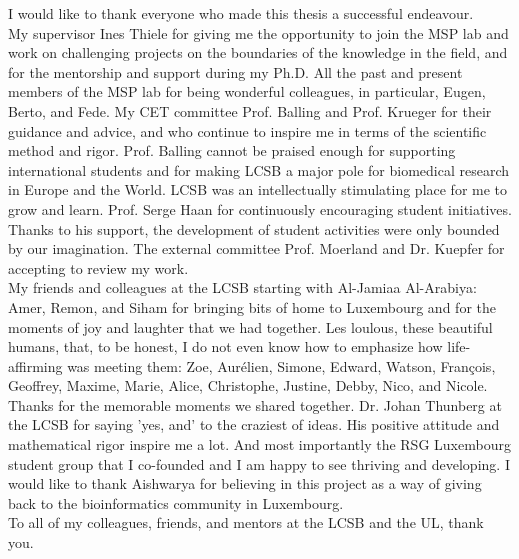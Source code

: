 I would like to thank everyone who made this thesis a successful endeavour.\\
My supervisor Ines Thiele for giving me the opportunity to join the MSP lab and work on challenging projects on the boundaries of the knowledge in the field, and for the mentorship and support during my Ph.D. All the past and present members of the MSP lab for being wonderful colleagues, in particular, Eugen, Berto, and Fede. My CET committee Prof. Balling and Prof. Krueger for their guidance and advice, and who continue to inspire me in terms of the scientific method and rigor. Prof. Balling cannot be praised enough for supporting international students and for making LCSB a major pole for biomedical research in Europe and the World. LCSB was an intellectually stimulating place for me to grow and learn. Prof. Serge Haan for continuously encouraging student initiatives. Thanks to his support, the development of student activities were only bounded by our imagination. The external committee Prof. Moerland and Dr. Kuepfer for accepting to review my work.\\
My friends and colleagues at the LCSB starting with Al-Jamiaa Al-Arabiya: Amer, Remon, and Siham for bringing bits of home to Luxembourg and for the moments of joy and laughter that we had together. Les loulous, these beautiful humans, that, to be honest, I do not even know how to emphasize how life-affirming was meeting them: Zoe, Aurélien, Simone, Edward, Watson, Fran\c{c}ois, Geoffrey, Maxime, Marie, Alice, Christophe, Justine, Debby, Nico, and Nicole. Thanks for the memorable moments we shared together. Dr. Johan Thunberg at the LCSB for saying 'yes, and' to the craziest of ideas. His positive attitude and mathematical rigor inspire me a lot. And most importantly the RSG Luxembourg student group that I co-founded and I am happy to see thriving and developing. I would like to thank Aishwarya for believing in this project as a way of giving back to the bioinformatics community in Luxembourg.\\
To all of my colleagues, friends, and mentors at the LCSB and the UL, thank you.